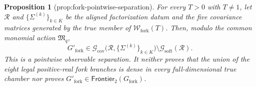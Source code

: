 \documentclass{article}
\newtheorem{proposition}{Proposition}
\begin{document}
\begin{proposition}[prop:fork-pointwise-separation]\label{prop:fork-pointwise-separation}
For every \(T>0\) with \(T\ne1\), let \(\mathcal R\) and \(\{\Sigma^{(k)}\}_{k\in K}\) be the aligned factorization datum and the five covariance matrices generated by the true member of \(\mathcal W_{\mathrm{fork}}(T)\).  Then, modulo the common monomial action \(\mathfrak M_q\),
\[
 G'_{\mathrm{fork}}\in
 \mathcal G_{\mathrm{cov}}\bigl(\mathcal R,\{\Sigma^{(k)}\}_{k\in K}\bigr)
 \setminus
 \mathcal G_{\mathrm{soft}}(\mathcal R).
\]
This is a pointwise observable separation.  It neither proves that the union of the eight legal positive-real fork branches is dense in every full-dimensional true chamber nor proves \(G'_{\mathrm{fork}}\in\mathsf{Frontier}_2(G_{\mathrm{fork}})\).
\end{proposition}
\end{document}
